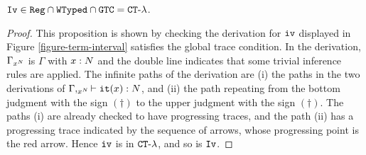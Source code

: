 \begin{proposition}
 \label{proposition-interval-in-CT-lambda}
${\tt Iv} \in {\tt Reg} \cap {\tt WTyped} \cap {\tt GTC} = { {\tt CT}\mbox{-}\lambda}$.
\end{proposition}
\begin{proof}
This proposition is shown by checking the derivation for ${\tt iv}$
displayed in Figure \ref{figure-term-interval} satisfies
the global trace condition. 
In the derivation, $\Gamma_{x^{N}}$ is $\Gamma$ with $x:{N}$ and the double line indicates that some trivial inference rules are applied.
The infinite paths of the derivation are
(i) the paths in the two derivations of $\Gamma,_{x^{N}}\vdash {\tt it}(x):{N}$, and
(ii) the path repeating from the bottom judgment with the sign $(\dagger)$ to the upper judgment with the sign $(\dagger)$.
The paths (i) are already checked to have progressing traces,
and the path (ii) has a progressing trace indicated by the sequence of arrows, whose progressing point is the red arrow.
Hence ${\tt iv}$ is in ${ {\tt CT}\mbox{-}\lambda}$, and so is ${\tt Iv}$. 
\end{proof}



